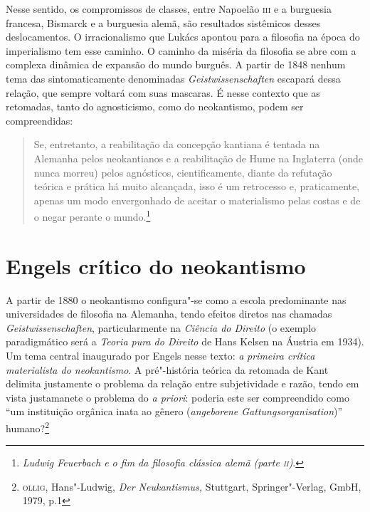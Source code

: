 Nesse sentido, os compromissos de classes, entre Napoelão \textsc{iii} e
a burguesia francesa, Bismarck e a burguesia alemã, são resultados
sistêmicos desses deslocamentos. O irracionalismo que Lukács apontou
para a filosofia na época do imperialismo tem esse caminho. O caminho da
miséria da filosofia se abre com a complexa dinâmica de expansão do
mundo burguês. A partir de 1848 nenhum tema das sintomaticamente
denominadas \emph{Geistwissenschaften} escapará dessa relação, que
sempre voltará com suas mascaras. É nesse contexto que as retomadas,
tanto do agnosticismo, como do neokantismo, podem ser compreendidas:

\begin{quote}
Se, entretanto, a reabilitação da concepção kantiana é tentada na
Alemanha pelos neokantianos e a reabilitação de Hume na Inglaterra (onde
nunca morreu) pelos agnósticos, cientificamente, diante da refutação
teórica e prática há muito alcançada, isso é um retrocesso e,
praticamente, apenas um modo envergonhado de aceitar o materialismo
pelas costas e de o negar perante o mundo.\footnote{\emph{Ludwig
  Feuerbach e o fim da filosofia clássica alemã (parte \textsc{ii})}.}
\end{quote}

\section*{Engels crítico do neokantismo}

A partir de 1880 o neokantismo configura"-se como a escola predominante
nas universidades de filosofia na Alemanha, tendo efeitos diretos nas
chamadas \emph{Geistwissenschaften}, particularmente na \emph{Ciência do
Direito} (o exemplo paradigmático será a \emph{Teoria pura do Direito}
de Hans Kelsen na Áustria em 1934). Um tema central inaugurado por
Engels nesse texto: \emph{a} \emph{primeira crítica materialista do
neokantismo}. A pré"-história teórica da retomada de Kant delimita
justamente o problema da relação entre subjetividade e razão, tendo em
vista justamanete o problema do \emph{a priori}: poderia este ser
compreendido como ``um instituição orgânica inata ao gênero
(\emph{angeborene Gattungsorganisation})'' humano?\footnote{\textsc{ollig},
  Hans"-Ludwig, \emph{Der Neukantismus,} Stuttgart, Springer"-Verlag,
  GmbH, 1979, p.1}

